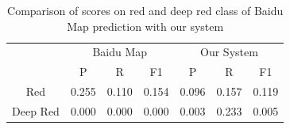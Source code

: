 
\begin{table}[]
	\centering
	\caption{Comparison of scores on red and deep red class of Baidu Map prediction with our system}
	\label{tbl:baiduf1}
	\begin{tabular}{|c|c|r|r|c|r|r|}
		\hline
		\multirow{2}{*}{} & \multicolumn{3}{c|}{Baidu Map}                                                            & \multicolumn{3}{c|}{Our System}                                                           \\ \cline{2-7} 
		& P                   & \multicolumn{1}{c|}{R} & \multicolumn{1}{c|}{F1} & P                   & \multicolumn{1}{c|}{R} & \multicolumn{1}{c|}{F1} \\ \hline
		Red               & \multicolumn{1}{r|}{0.255} & 0.110                      & 0.154                        & \multicolumn{1}{r|}{0.096} & 0.157                      & 0.119                        \\ \hline
		Deep Red          & \multicolumn{1}{r|}{0.000}      & 0.000                           & 0.000                             & \multicolumn{1}{r|}{0.003} & 0.233                      & 0.005                        \\ \hline
	\end{tabular}
\end{table}


